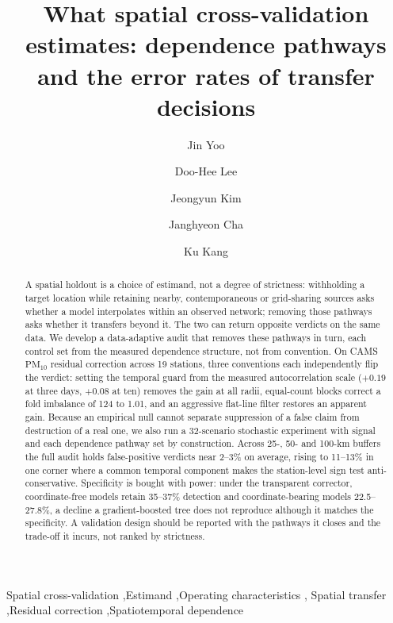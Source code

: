 \documentclass[preprint,12pt]{elsarticle}
\newcommand*{\pmten}{\ensuremath{\mathrm{PM_{10}}}}
\begin{document}
\begin{frontmatter}

\title{What spatial cross-validation estimates: dependence pathways and
the error rates of transfer decisions}

\author[cbrn]{Jin Yoo}
\author[cbrn]{Doo-Hee Lee}
\author[snu]{Jeongyun Kim}
\author[knpa]{Janghyeon Cha}
\author[cbrn]{Ku Kang}



\begin{abstract}
A spatial holdout is a choice of estimand, not a degree of strictness: withholding a target location while retaining nearby, contemporaneous or grid-sharing sources asks whether a model interpolates within an observed network; removing those pathways asks whether it transfers beyond it. The two can return opposite verdicts on the same data. We develop a data-adaptive audit that removes these pathways in turn, each control set from the measured dependence structure, not from convention. On CAMS \pmten{} residual correction across 19 stations, three conventions each independently flip the verdict: setting the temporal guard from the measured autocorrelation scale ($+0.19$ at three days, $+0.08$ at ten) removes the gain at all radii, equal-count blocks correct a fold imbalance of 124 to 1.01, and an aggressive flat-line filter restores an apparent gain. Because an empirical null cannot separate suppression of a false claim from destruction of a real one, we also run a 32-scenario stochastic experiment with signal and each dependence pathway set by construction. Across 25-, 50- and 100-km buffers the full audit holds false-positive verdicts near 2--3\% on average, rising to 11--13\% in one corner where a common temporal component makes the station-level sign test anti-conservative. Specificity is bought with power: under the transparent corrector, coordinate-free models retain 35--37\% detection and coordinate-bearing models 22.5--27.8\%, a decline a gradient-boosted tree does not reproduce although it matches the specificity. A validation design should be reported with the pathways it closes and the trade-off it incurs, not ranked by strictness.
\end{abstract}

\begin{keyword}
Spatial cross-validation \sep Estimand \sep Operating characteristics \sep
Spatial transfer \sep Residual correction \sep Spatiotemporal dependence
\end{keyword}

\end{frontmatter}
\end{document}
